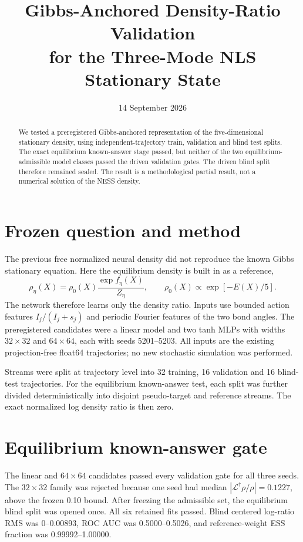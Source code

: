 \documentclass[11pt]{article}
\title{Gibbs-Anchored Density-Ratio Validation\\for the Three-Mode NLS Stationary State}
\author{}
\date{14 September 2026}
\newcommand{\Lag}{\mathcal{L}^{\dagger}}
\begin{document}
\maketitle

\begin{abstract}
We tested a preregistered Gibbs-anchored representation of the five-dimensional
stationary density, using independent-trajectory train, validation and blind
test splits.  The exact equilibrium known-answer stage passed, but neither of
the two equilibrium-admissible model classes passed the driven validation
gates.  The driven blind split therefore remained sealed.  The result is a
methodological partial result, not a numerical solution of the NESS density.
\end{abstract}

\section{Frozen question and method}
The previous free normalized neural density did not reproduce the known Gibbs
stationary equation.  Here the equilibrium density is built in as a reference,
\begin{equation}
 \rho_\eta(X)=\rho_0(X)\frac{\exp f_\eta(X)}{Z_\eta},
 \qquad \rho_0(X)\propto \exp[-E(X)/5].
\end{equation}
The network therefore learns only the density ratio.  Inputs use bounded action
features $I_j/(I_j+s_j)$ and periodic Fourier features of the two bond angles.
The preregistered candidates were a linear model and two tanh MLPs with widths
$32\times32$ and $64\times64$, each with seeds 5201--5203.  All inputs are the
existing projection-free float64 trajectories; no new stochastic simulation
was performed.

Streams were split at trajectory level into 32 training, 16 validation and 16
blind-test trajectories.  For the equilibrium known-answer test, each split was
further divided deterministically into disjoint pseudo-target and reference
streams.  The exact normalized log density ratio is then zero.

\section{Equilibrium known-answer gate}
The linear and $64\times64$ candidates passed every validation gate for all
three seeds.  The $32\times32$ family was rejected because one seed had median
$|\Lag\rho/\rho|=0.1227$, above the frozen 0.10 bound.  After freezing the
admissible set, the equilibrium blind split was opened once.  All six retained
fits passed.  Blind centered log-ratio RMS was 0--0.00893, ROC AUC was
0.5000--0.5026, and reference-weight ESS fraction was 0.99992--1.00000.
\end{document}
